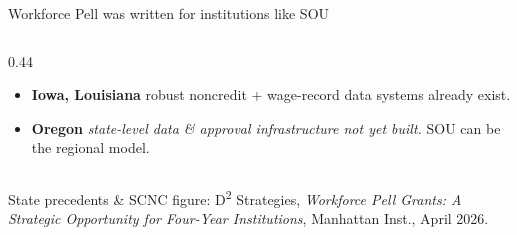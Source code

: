 \documentclass[aspectratio=169,11pt]{beamer}
\newcommand{\monoLabel}[1]{%
  {\ttfamily\fontsize{7.5pt}{9pt}\selectfont\color{textMuted}#1}%
}
\begin{document}
\begin{frame}{Workforce Pell was written for institutions like SOU}
\begin{columns}[T,onlytextwidth]
\begin{column}{0.44\textwidth}
\begin{itemize}
        \item \textbf{Iowa, Louisiana} \textemdash{} robust
              noncredit + wage-record data systems already exist.
        \item \textbf{Oregon} \textemdash{} \textit{state-level data
              \& approval infrastructure not yet built.} SOU can
              be the regional model.
      \end{itemize}
    \end{column}
  \end{columns}
  \vspace{6pt}
  {\centering
   \monoLabel{State precedents \& SCNC figure: D\textsuperscript{2} Strategies, \emph{Workforce Pell Grants: A Strategic Opportunity for Four-Year Institutions}, Manhattan Inst., April 2026.}\par}
\end{frame}
\end{document}
